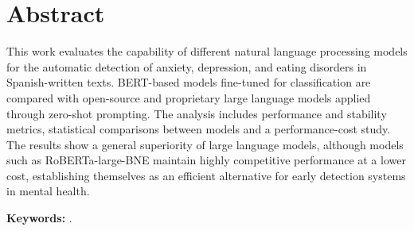 %
%
%
% 
%
%
%
%

\chapter*{Abstract}
\label{cha:abstract}


This work evaluates the capability of different natural language processing models for the automatic detection of anxiety, depression, and eating disorders in Spanish-written texts. BERT-based models fine-tuned for classification are compared with open-source and proprietary large language models applied through zero-shot prompting. The analysis includes performance and stability metrics, statistical comparisons between models and a performance-cost study. The results show a general superiority of large language models, although models such as RoBERTa-large-BNE maintain highly competitive performance at a lower cost, establishing themselves as an efficient alternative for early detection systems in mental health.


\textbf{Keywords:} \myThesisKeywordsEnglish.



